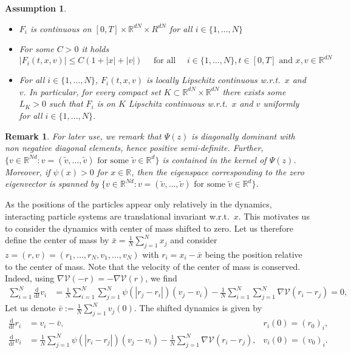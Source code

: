 \documentclass[10pt,a4paper]{amsart}
\newtheorem{assumption}{Assumption}
\newtheorem{remark}{Remark}
\newcommand{\R}[0]{\mathbb R}
\newcommand{\V}[0]{\mathcal V}
\newcommand{\dd}[0]{\mathrm d}
\newcommand{\sumj}[0]{\sum_{j=1}^N}
\begin{document}
\begin{assumption}\label{ass:particle}
\begin{itemize}
    \item [(1)] $F_i$ is continuous on $[0,T] \times \R^{dN} \times R^{dN}$ for all $i\in\{1,\dots,N\}$
    \item [(2)] For some $C>0$ it holds
    \[|F_i(t,x,v)| \le C(1+|x|+|v|) \quad \text{ for all }\quad i\in\{1,\dots,N\}, t\in[0,T] \text{ and } x,v\in \R^{dN}\]
    \item [(3)] For all $i\in\{1,\dots,N\}$, $F_i(t,x,v)$ is locally Lipschitz continuous w.r.t.~$x$ and $v$. In particular, for every compact set $K \subset \R^{dN} \times \R^{dN}$ there exists some $L_K>0$ such that 
    $F_i$ is on $K$ Lipschitz continuous  w.r.t.~$x$ and $v$ uniformly for all  $i\in\{1,\dots,N\}$.
\end{itemize}
\end{assumption}

\begin{remark}\label{rem:Psi}
For later use, we remark that  $\Psi(z)$ is diagonally dominant with non negative diagonal elements, hence positive semi-definite. Further, $\{ v \in \R^{Nd} : v = (\tilde v, \dots, \tilde v) \text{ for some } \tilde v \in \R^d \} $ is contained in the kernel of $\Psi(z)$. Moreover, if  $\psi(x)>0$  for $x\in\R$, then the eigenspace corresponding to the zero eigenvector is  spanned by $\{ v \in \R^{Nd} : v = (\tilde v, \dots, \tilde v) \text{ for some } \tilde v \in \R^d \} $.
\end{remark}
% 
As the positions of the particles appear only relatively in the dynamics, interacting particle systems are translational invariant w.r.t.~$x$. This motivates us to consider the dynamics with center of mass shifted to zero. Let us therefore  define the center of mass by $\bar x = \frac1N \sumj x_j$ and consider $z=(r,v)=(r_1,\dots,r_N,v_1,\dots,v_N)$ with $r_i = x_i - \bar x$ being the position relative to the center of mass. Note that the velocity of the center of mass is conserved. Indeed, using 
$\nabla \mathcal V(-r) = -\nabla \mathcal V(r)$, we find
\begin{align}\label{eqn:meanv}
\sum_{i=1}^N\frac{\dd}{\dd t} v_i &= \frac{1}{N}\sum_{i=1}^N\sumj \psi(|r_j - r_i|)(v_j - v_i) - \frac{1}{N} \sum_{i=1}^N\sumj \nabla \V(r_i - r_j)=0,
\end{align}
Let us denote $\bar v := \frac1N \sumj v_j(0)$. The shifted dynamics is given by
\begin{subequations}\label{eq:phs}
\begin{align}\label{eqn:phs1}
    \frac{\dd}{\dd t} r_i &= v_i - \bar v,  &r_i(0) = (r_0)_i, \\
    \frac{\dd}{\dd t} v_i &= \frac{1}{N}\sumj \psi(| r_i - r_j |)(v_j - v_i) - \frac{1}{N} \sumj \nabla \mathcal V(r_ i - r_j),  &v_i(0)=(v_0)_i.\label{eqn:phs2}
\end{align}
\end{subequations}
\end{document}
